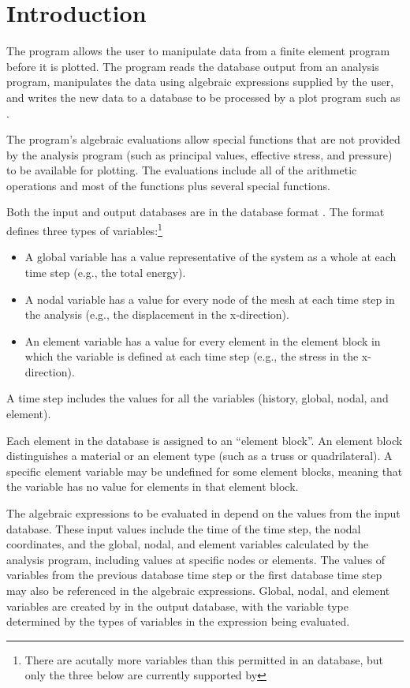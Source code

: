 \chapter{Introduction} \label{chap:intro}

The \caps{\PROGRAM} program allows the user to manipulate data from a
finite element program before it is plotted. The program reads the
database output from an analysis program, manipulates the data using 
algebraic expressions supplied by the user, and writes the new data to a
database to be processed by a plot program such as 
\cite{bib:blot}.

The program's algebraic evaluations allow special functions that are not
provided by the analysis program (such as principal values, effective
stress, and pressure) to be available for plotting. The evaluations
include all of the  arithmetic operations and most of the
 functions plus several special functions.

Both the input and output databases are in the \exo{} database
format \cite{bib:exodus}. The \exo{} format defines three types of
variables:\footnote{There are acutally more variables than this
  permitted in an \exo{} database, but only the three below are
  currently supported by \caps{\PROGRAM}}
\setlength{\itemsep}{\medskipamount} \begin{itemize}
\item
A global variable has a value representative of the system as a whole
at each time step (e.g., the total energy).
\item
A nodal variable has a value for every node of the mesh at each time
step in the analysis (e.g., the displacement in the x-direction).
\item
An element variable has a value for every element in the element block
in which the variable is defined at each time step (e.g., the stress in the
x-direction).  

\end{itemize}

A time step includes the values for all the variables (history,
global, nodal, and element).

Each element in the database is assigned to an ``element block''. An
element block distinguishes a material or an element type (such as a
truss or quadrilateral). A specific element variable may be undefined
for some element blocks, meaning that the variable has no value for
elements in that element block.

The algebraic expressions to be evaluated in \caps{\PROGRAM} depend on
the values from the input database. These input values include the time
of the time step, the nodal coordinates, and the global, nodal,
and element variables calculated by the analysis program, including
values at specific nodes or elements. The values of variables from the
previous database time step or the first database time step may also be
referenced in the algebraic expressions. Global, nodal, and
element variables are created by \caps{\PROGRAM} in the output database,
with the variable type determined by the types of variables in the
expression being evaluated.

